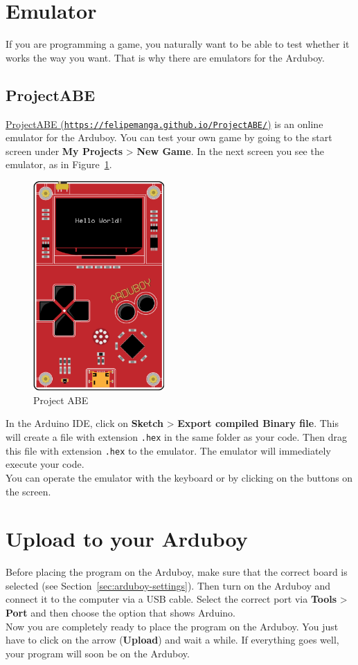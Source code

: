 \documentclass[11pt,fleqn]{book} %
\begin{document}
\newpage
\section{Emulator}
If you are programming a game, you naturally want to be able to test whether it works the way you want. That is why there are emulators for the Arduboy.

\subsection{ProjectABE}
\href{https://felipemanga.github.io/ProjectABE/}{ProjectABE (\texttt{https://felipemanga.github.io/ProjectABE/})} is an online emulator for the Arduboy.
You can test your own game by going to the start screen under \textbf{My Projects} > \textbf{New Game}. In the next screen you see the emulator, as in Figure~\ref{fig:projectabe}.

\begin{figure}
	\centering
	\includegraphics[width=5cm]{../assets/ProjectABE}
	\caption{Project ABE}
	\label{fig:projectabe}
\end{figure}

In the Arduino IDE, click on \textbf{Sketch} > \textbf{Export compiled Binary file}. This will create a file with extension \texttt{.hex} in the same folder as your code. Then drag this file with extension \texttt{.hex} to the emulator. The emulator will immediately execute your code. \\
You can operate the emulator with the keyboard or by clicking on the buttons on the screen.

\section{Upload to your Arduboy}
Before placing the program on the Arduboy, make sure that the correct board  is selected (see Section~\ref{sec:arduboy-settings}). Then turn on the Arduboy and connect it to the computer via a USB cable. Select the correct port via \textbf{Tools} > \textbf{Port} and then choose the option that shows Arduino. \\
Now you are completely ready to place the program on the Arduboy. You just have to click on the arrow (\textbf{Upload}) and wait a while. If everything goes well, your program will soon be on the Arduboy.
\end{document}
